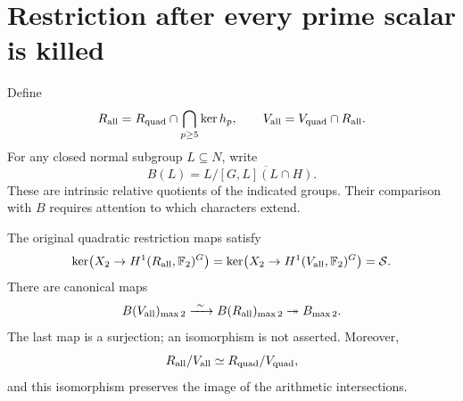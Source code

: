 \section{Restriction after every prime scalar is killed}
\label{sec:all-cm-original-restriction}

Define
\[
 R_{\rm all}=R_{\rm quad}\cap\bigcap_{p\geq5}\ker h_p,\qquad
 V_{\rm all}=V_{\rm quad}\cap R_{\rm all}.
\]
For any closed normal subgroup \(L\subseteq N\), write
\[
 B(L)=L/\overline{[G,L](L\cap H)}.
\]
These are intrinsic relative quotients of the indicated
groups. Their comparison with \(B\) requires attention
to which characters extend.

\begin{theorem}
\label{thm:all-cm-original-restriction}
The original quadratic restriction maps satisfy
\begin{equation}
 \ker\bigl(X_2\to H^1(R_{\rm all},\mathbb F_2)^G\bigr)
 =\ker\bigl(X_2\to H^1(V_{\rm all},\mathbb F_2)^G\bigr)
 =\mathcal S.
 \label{eq:all-cm-original-kernel}
\end{equation}
There are canonical maps
\begin{equation}
 B(V_{\rm all})_{\max2}
       \xrightarrow{\ \sim\ }B(R_{\rm all})_{\max2}
       \twoheadrightarrow B_{\max2}.
 \label{eq:all-cm-relative-surjection}
\end{equation}
The last map is a surjection; an isomorphism is not
asserted. Moreover,
\[
 R_{\rm all}/V_{\rm all}
       \simeq R_{\rm quad}/V_{\rm quad},
\]
and this isomorphism preserves the image of the
arithmetic intersections.
\end{theorem}
